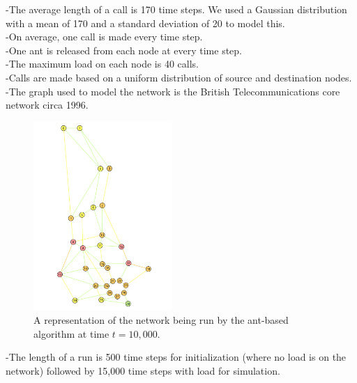 -The average length of a call is 170 time steps. We used a Gaussian distribution with a mean of 170 and a standard deviation of 20 to model this.\\

-On average, one call is made every time step.\\

-One ant is released from each node at every time step.\\

-The maximum load on each node is 40 calls.\\

-Calls are made based on a uniform distribution of source and destination nodes.\\

-The graph used to model the network is the British Telecommunications core network circa 1996.\\

\begin{figure}[htb]

  \centering
  \includegraphics[width=0.47\textwidth]{figs/btc.jpg}
  \caption{A representation of the network being run by the ant-based algorithm at time $t = 10,000$.}
  \label{fig:btc}

\end{figure}

-The length of a run is 500 time steps for initialization (where no load is on the network) followed by 15,000 time steps with load for simulation.
